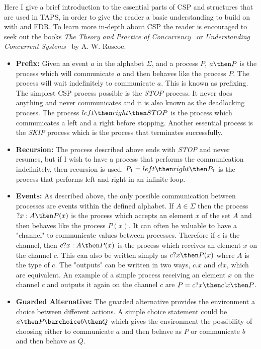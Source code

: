 Here I give a brief introduction to the essential parts of CSP and structures that are used in TAPS, in order to give the reader a basic understanding to build on with \cspm{} and FDR. To learn more in-depth about CSP the reader is encouraged to seek out the books \textit{The Theory and Practice of Concurrency}~\cite{Roscoe1997} or \textit{Understanding Concurrent Systems}~\cite{Roscoe2010} by A. W. Roscoe.
\begin{itemize}
    \item \textbf{Prefix:} Given an event $a$ in the alphabet $\Sigma$, and a process $P$, $a \then P$ is the process which will communicate $a$ and then behaves like the process $P$. The process will wait indefinitely to communicate $a$. This is known as prefixing.
    The simplest CSP process possible is the \textit{STOP} process. It never does anything and never communicates and it is also known as the deadlocking process. The process $left \then right \then STOP$ is the process which communicates a left and a right before stopping. Another essential process is the \textit{SKIP} process which is the process that terminates successfully.
    \item \textbf{Recursion:} The process described above ends with \textit{STOP} and never resumes, but if I wish to have a process that performs the communication indefinitely, then recursion is used.
    $P_1 = left \then right \then P_1$ is the process that performs left and right in an infinite loop.
    \item \textbf{Events:} As described above, the only possible communication between processes are events within the defined alphabet. If $A \in \Sigma$ then the process $?x : A \then P(x)$ is the process which accepts an element $x$ of the set $A$ and then behaves like the process $P(x)$.
    It can often be valuable to have a "channel" to communicate values between processes. Therefore if $c$ is the channel, then $c?x : A \then P(x)$ is the process which receives an element $x$ on the channel $c$. This can also be written simply as $c?x \then P(x)$ where $A$ is the type of $c$. The "outputs" can be written in two ways, $c.x$ and $c!x$, which are equivalent. An example of a simple process receiving an element $x$ on the channel $c$ and outputs it again on the channel $c$ are $P = c?x \then c!x \then P$.
    \item \textbf{Guarded Alternative:} The guarded alternative provides the environment a choice between different actions. A simple choice statement could be $a \then P \barchoice b \then Q$ which gives the environment the possibility of choosing either to communicate $a$ and then behave as $P$ or communicate $b$ and then behave as $Q$.

\end{itemize}
